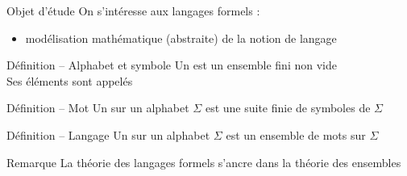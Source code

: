 
\begingroup


\begin{frame}{Objet d'étude}
  On s'intéresse aux langages \alert{formels} :
  \begin{itemize}
  \item modélisation mathématique (abstraite) de la notion de langage
  \end{itemize}
  
  \begin{block}{Définition -- Alphabet et symbole}
    Un  est un \alert{ensemble fini non vide}\\
    Ses éléments sont appelés 
  \end{block}
  \begin{block}{Définition -- Mot}
    Un  sur un alphabet $\Sigma$ est une \alert{suite finie de symboles} de $\Sigma$
  \end{block}
  \begin{block}{Définition -- Langage}
    Un  sur un alphabet $\Sigma$ est un \alert{ensemble de mots} sur $\Sigma$
  \end{block}
  \begin{alertblock}{Remarque}
    La \alert{théorie des langages formels} s'ancre dans la \alert{théorie des ensembles}
  \end{alertblock}
\end{frame}

\endgroup
